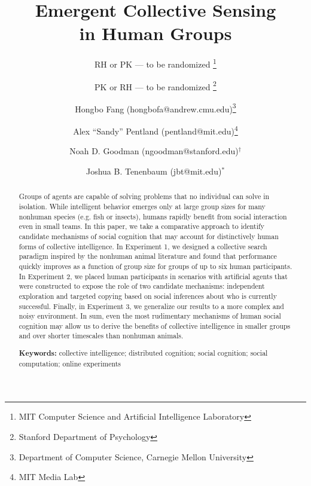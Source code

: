 \documentclass[12pt,letterpaper]{article}
\title{Emergent Collective Sensing \\in Human Groups}
\author{
RH or PK --- to be randomized \thanks{MIT Computer Science and Artificial Intelligence Laboratory}
\vspace{-.5em}
\and 
PK or RH --- to be randomized \thanks{Stanford Department of Psychology}
\vspace{-.5em}
\and 
Hongbo Fang (hongbofa@andrew.cmu.edu)\thanks{Department of Computer Science, Carnegie Mellon University}
\vspace{-.5em}
\and
Alex ``Sandy'' Pentland (pentland@mit.edu)\thanks{MIT Media Lab}
\and 
Noah D. Goodman (ngoodman@stanford.edu)$^\dagger$
\and 
Joshua B. Tenenbaum (jbt@mit.edu)$^*$
}
\date{}
\begin{document}
\maketitle
\vspace{-2em}

\begin{abstract}

Groups of agents are capable of solving problems that no individual can solve in isolation. 
While intelligent behavior emerges only at large group sizes for many nonhuman species (e.g. fish or insects), humans rapidly benefit from social interaction even in small teams. 
In this paper, we take a comparative approach to identify candidate  mechanisms of social cognition that may account for distinctively human forms of collective intelligence. 
In Experiment 1, we designed a collective search paradigm inspired by the nonhuman animal literature and found that performance quickly improves as a function of group size for groups of up to six human participants.
In Experiment 2, we placed human participants in scenarios with artificial agents that were constructed to expose the role of two candidate mechanisms: independent exploration and targeted copying based on social inferences about who is currently successful. 
Finally, in Experiment 3, we generalize our results to a more complex and noisy environment. 
In sum, even the most rudimentary mechanisms of human social cognition may allow us to derive the benefits of collective intelligence in smaller groups and over shorter timescales than nonhuman animals.

\textbf{Keywords:}
  collective intelligence; distributed cognition;
  social cognition; social computation; online experiments
\end{abstract}
\end{document}

